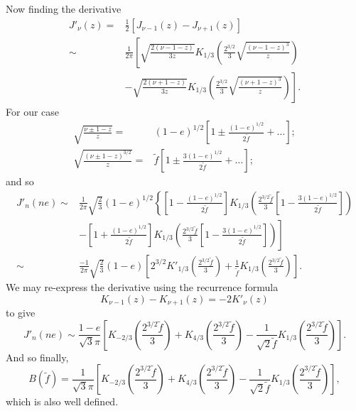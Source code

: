 \documentclass[a4paper, 11pt, titlepage, twoside]{report}
\newcommand{\recip}[1]{\ensuremath{\frac{1}{#1}}}
\begin{document}
Now finding the derivative
\begin{align}
J'_\nu(z) = {} & \recip{2}\left[J_{\nu-1}(z) - J_{\nu+1}(z)\right] \nonumber \\
 \sim {} & \recip{2\pi}\left[\sqrt{\frac{2(\nu -1 - z)}{3z}}K_{1/3}\left(\frac{2^{3/2}}{3}\sqrt{\frac{(\nu - 1 - z)^3}{z}}\right) \right. \nonumber \\
  & \left. - \sqrt{\frac{2(\nu +1 - z)}{3z}}K_{1/3}\left(\frac{2^{3/2}}{3}\sqrt{\frac{(\nu + 1 - z)^3}{z}}\right)\right].
\end{align}
For our case
\begin{align}
\sqrt{\frac{\nu \pm 1 - z}{z}} = {} & (1 - e)^{1/2}\left[1 \pm \frac{(1-e)^{1/2}}{2\widetilde{f}} + \ldots\right];\\
\sqrt{\frac{(\nu \pm 1 - z)^{3/2}}{z}} = {} & \widetilde{f}\left[1 \pm \frac{3(1-e)^{1/2}}{2\widetilde{f}} + \ldots\right];
\end{align}
and so
\begin{align}
J'_n(ne) \sim {} & \recip{2\pi}\sqrt{\frac{2}{3}}(1-e)^{1/2}\left\{\left[1 - \frac{(1-e)^{1/2}}{2\widetilde{f}}\right]K_{1/3}\left(\frac{2^{3/2}\widetilde{f}}{3}\left[1 - \frac{3(1-e)^{1/2}}{2\widetilde{f}}\right]\right) \right. \nonumber \\
 & \left. - \left[1 + \frac{(1-e)^{1/2}}{2\widetilde{f}}\right]K_{1/3}\left(\frac{2^{3/2}\widetilde{f}}{3}\left[1 - \frac{3(1-e)^{1/2}}{2\widetilde{f}}\right]\right)\right]\nonumber \\
 \sim {} & \frac{-1}{2\pi}\sqrt{\frac{2}{3}}(1-e)\left[2^{3/2}K'_{1/3}\left(\frac{2^{3/2}\widetilde{f}}{3}\right) + \recip{\widetilde{f}}K_{1/3}\left(\frac{2^{3/2}\widetilde{f}}{3}\right)\right].
\end{align}
We may re-express the derivative using the recurrence formula\cite{Watson1995}
\begin{equation}
K_{\nu-1}(z) - K_{\nu+1}(z) = -2K'_\nu(z)
\end{equation}
to give
\begin{equation}
J'_n(ne) \sim \frac{1-e}{\sqrt{3}\pi}\left[K_{-2/3}\left(\frac{2^{3/2}\widetilde{f}}{3}\right) + K_{4/3}\left(\frac{2^{3/2}\widetilde{f}}{3}\right) - \recip{\sqrt{2}\widetilde{f}}K_{1/3}\left(\frac{2^{3/2}\widetilde{f}}{3}\right)\right].
\end{equation}
And so finally,
\begin{equation}
B(\widetilde{f}) = \recip{\sqrt{3}\pi}\left[K_{-2/3}\left(\frac{2^{3/2}\widetilde{f}}{3}\right) + K_{4/3}\left(\frac{2^{3/2}\widetilde{f}}{3}\right) - \recip{\sqrt{2}\widetilde{f}}K_{1/3}\left(\frac{2^{3/2}\widetilde{f}}{3}\right)\right],
\end{equation}
which is also well defined.
\end{document}

